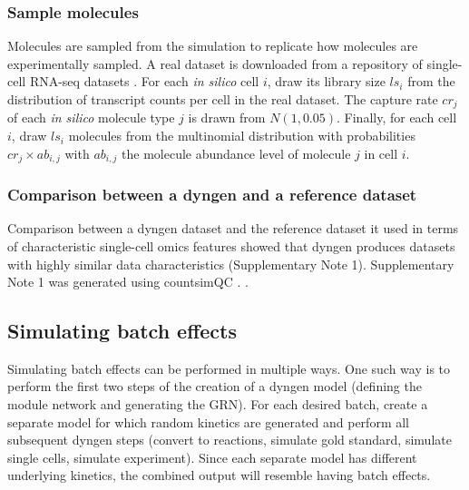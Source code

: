 \documentclass[10pt, a4paper]{article}
\begin{document}
\hypertarget{sample-molecules}{%
	\subsubsection*{Sample molecules}\label{sample-molecules}}

Molecules are sampled from the simulation to replicate how molecules are
experimentally sampled. A real dataset is downloaded from a repository
of single-cell RNA-seq datasets
\cite{cannoodt_singlecellomicsdatasets_2018}. For each \emph{in
	silico} cell \(i\), draw its library size \(ls_i\) from the distribution
of transcript counts per cell in the real dataset. The capture rate
\(cr_j\) of each \emph{in silico} molecule type \(j\) is drawn from
\(N(1, 0.05)\). Finally, for each cell \(i\), draw \(ls_i\) molecules
from the multinomial distribution with probabilities
\(cr_j \times ab_{i,j}\) with \(ab_{i,j}\) the molecule abundance level
of molecule \(j\) in cell \(i\).

\hypertarget{comparison-between-a-dyngen-and-a-reference-dataset}{%
	\subsubsection*{Comparison between a dyngen and a reference
		dataset}\label{comparison-between-a-dyngen-and-a-reference-dataset}}

Comparison between a dyngen dataset and the reference dataset it used in
terms of characteristic single-cell omics features showed that dyngen
produces datasets with highly similar data characteristics
(Supplementary Note 1). Supplementary Note 1 was generated using
countsimQC \cite{soneson_unifiedqualityverification_2018}. .

\hypertarget{sec:dyngen-batcheffect}{%
	\subsection*{Simulating batch effects}\label{sec:dyngen-batcheffect}}

Simulating batch effects can be performed in multiple ways. One such way
is to perform the first two steps of the creation of a dyngen model
(defining the module network and generating the GRN). For each desired
batch, create a separate model for which random kinetics are generated
and perform all subsequent dyngen steps (convert to reactions, simulate
gold standard, simulate single cells, simulate experiment). Since each
separate model has different underlying kinetics, the combined output
will resemble having batch effects.
\end{document}
